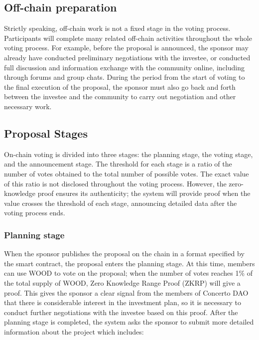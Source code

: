 \documentclass[UTF8]{article}
\begin{document}
\begin{multicols}{2}
\subsection{Off-chain preparation}


Strictly speaking, off-chain work is not a fixed stage in the voting process. Participants will complete many related off-chain activities throughout the whole voting process. For example, before the proposal is announced, the sponsor may already have conducted preliminary negotiations with the investee, or conducted full discussion and information exchange with the community online, including through forums and group chats. During the period from the start of voting to the final execution of the proposal, the sponsor must also go back and forth between the investee and the community to carry out negotiation and other necessary work.

\subsection{Proposal Stages}

On-chain voting is divided into three stages: the planning stage, the voting stage, and the announcement stage. The threshold for each stage is a ratio of the number of votes obtained to the total number of possible votes. The exact value of this ratio is not disclosed throughout the voting process. However, the zero-knowledge proof ensures its authenticity; the system will provide proof when the value crosses the threshold of each stage, announcing detailed data after the voting process ends.

 \subsubsection{Planning stage}

 When the sponsor publishes the proposal on the chain in a format specified by the smart contract, the proposal enters the planning stage. At this time, members can use WOOD to vote on the proposal; when the number of votes reaches 1\% of the total supply of WOOD, Zero Knowledge Range Proof (ZKRP) will give a proof. This gives the sponsor a clear signal from the members of Concerto DAO that there is considerable interest in the investment plan, so it is necessary to conduct further negotiations with the investee based on this proof. After the planning stage is completed, the system asks the sponsor to submit more detailed information about the project which includes:



\end{multicols}
\end{document}
